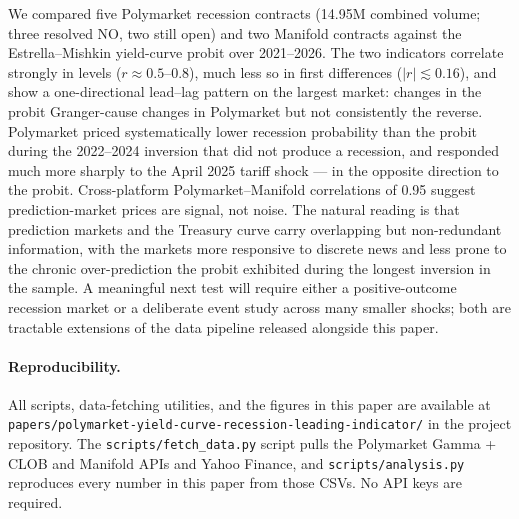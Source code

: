 \documentclass{article}
\begin{document}
We compared five Polymarket recession contracts (\textdollar 14.95M combined volume; three resolved NO, two still open) and two Manifold contracts against the Estrella--Mishkin yield-curve probit over 2021--2026. The two indicators correlate strongly in levels ($r\approx 0.5$--$0.8$), much less so in first differences ($|r|\lesssim 0.16$), and show a one-directional lead--lag pattern on the largest market: changes in the probit Granger-cause changes in Polymarket but not consistently the reverse. Polymarket priced systematically lower recession probability than the probit during the 2022--2024 inversion that did not produce a recession, and responded much more sharply to the April 2025 tariff shock --- in the opposite direction to the probit. Cross-platform Polymarket--Manifold correlations of \num{0.95} suggest prediction-market prices are signal, not noise. The natural reading is that prediction markets and the Treasury curve carry overlapping but non-redundant information, with the markets more responsive to discrete news and less prone to the chronic over-prediction the probit exhibited during the longest inversion in the sample. A meaningful next test will require either a positive-outcome recession market or a deliberate event study across many smaller shocks; both are tractable extensions of the data pipeline released alongside this paper.

\paragraph{Reproducibility.}
All scripts, data-fetching utilities, and the figures in this paper are available at \texttt{papers/polymarket-yield-curve-recession-leading-indicator/} in the project repository. The \texttt{scripts/fetch\_data.py} script pulls the Polymarket Gamma + CLOB and Manifold APIs and Yahoo Finance, and \texttt{scripts/analysis.py} reproduces every number in this paper from those CSVs. No API keys are required.



\end{document}
